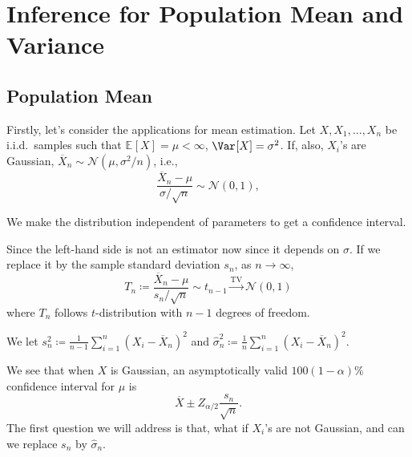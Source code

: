 \section{Inference for Population Mean and Variance}
\subsection{Population Mean}
Firstly, let's consider the applications for mean estimation. Let \(X, X_1, \dots , X_n\) be i.i.d.\ samples such that \(\mathbb{E}_{}[X] = \mu < \infty \), \(\Var_{}[X] = \sigma ^2\). If, also, \(X_i\)'s are Gaussian, \(\overline{X} _n \sim \mathcal{N} (\mu , \sigma ^2 / n)\), i.e.,
\[
	\frac{\overline{X} _n - \mu }{\sigma / \sqrt{n} } \sim \mathcal{N} (0, 1),
\]

\begin{intuition}
	We make the distribution independent of parameters to get a confidence interval.
\end{intuition}

Since the left-hand side is not an estimator now since it depends on \(\sigma \). If we replace it by the sample standard deviation \(s_n\), as \(n \to \infty \),
\[
	T_n \coloneqq \frac{\overline{X} _n - \mu }{s_n / \sqrt{n} } \sim t_{n-1} \overset{\operatorname{TV}}{\to } \mathcal{N} (0, 1)
\]
where \(T_n\) follows \(t\)-distribution with \(n-1\) degrees of freedom.

\begin{notation}
	We let \(s_n^2 \coloneqq \frac{1}{n-1} \sum_{i=1}^{n} (X_i - \overline{X} _n)^2\) and \(\hat{\sigma} _n^2 \coloneqq \frac{1}{n} \sum_{i=1}^{n} (X_i - \overline{X} _n)^2\).
\end{notation}

We see that when \(X\) is Gaussian, an asymptotically valid \(100 (1 - \alpha )\%\) confidence interval for \(\mu \) is
\[
	\overline{X} \pm Z_{\alpha / 2} \frac{s_n}{\sqrt{n} }.
\]
The first question we will address is that, what if \(X_i\)'s are not Gaussian, and can we replace \(s_n\) by \(\hat{\sigma} _n\).


